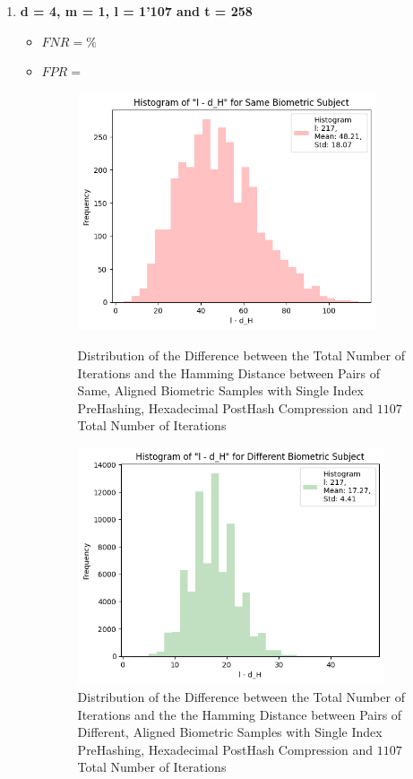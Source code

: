 \begin{enumerate}
    \item \textbf{d = 4, m = 1, l = 1'107 and t = 258}
        \begin{itemize}
            \item $FNR = \%$
            \item $FPR = $

            \begin{figure}[H]
                \centering
                \begin{minipage}[b]{0.48\linewidth}
                    \centering
                    \includegraphics[width=\linewidth,height=7cm,keepaspectratio]{latex-img/l-dHconfig1a_same.png}
                    \caption{Distribution of the Difference between the Total Number of Iterations and the Hamming Distance between Pairs of Same, Aligned Biometric Samples with Single Index PreHashing, Hexadecimal PostHash Compression and $1107$ Total Number of Iterations}
                    \label{l-dHconfig1a_same}
                \end{minipage}
                \hfill
                \begin{minipage}[b]{0.48\linewidth}
                    \centering
                    \includegraphics[width=\linewidth,height=7cm,keepaspectratio]{latex-img/l-dHconfig1a_diff.png}
                    \caption{Distribution of the Difference between the Total Number of Iterations and the the Hamming Distance between Pairs of Different, Aligned Biometric Samples with Single Index PreHashing, Hexadecimal PostHash Compression and $1107$ Total Number of Iterations}
                    \label{l-dHconfig1a_diff}
                \end{minipage}
            \end{figure}
            

\end{itemize}
\end{enumerate}
